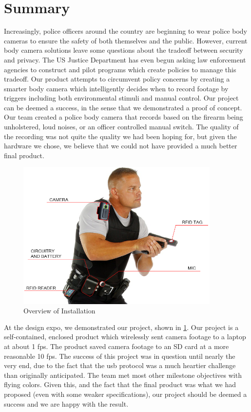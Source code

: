 \documentclass[12pt]{article}
\begin{document}
\section{Summary}
Increasingly, police officers around the country are beginning to wear police
body cameras to ensure the safety of both themselves and the public. However,
current body camera solutions leave some questions about the tradeoff between
security and privacy. The US Justice Department has even begun asking law
enforcement agencies to construct and pilot programs which create policies to
manage this tradeoff\cite{officer_privacy}. Our product attempts to circumvent
policy concerns by creating a smarter body camera which intelligently decides
when to record footage by triggers including both environmental stimuli and
manual control.  Our project can be deemed a success, in the sense that we
demonstrated a proof of concept. Our team created a police body camera that
records based on the firearm being unholstered, loud noises, or an officer
controlled manual switch.  The quality of the recording was not quite the
quality we had been hoping for, but given the hardware we chose, we believe
that we could not have provided a much better final product. 

\begin{figure}[h]
    \centering
    \includegraphics[width=0.9\textwidth]{installation}
    \caption{Overview of Installation}
    \label{fig:installation}
\end{figure}

At the design expo, we demonstrated our project, shown in
\ref{fig:installation}.  Our project is a self-contained, enclosed product
which wirelessly sent camera footage to a laptop at about 1 \gls{fps}. The
product saved camera footage to an SD card at a more reasonable 10 \gls{fps}.
The success of this project was in question until nearly the very end, due to
the fact that the \gls{usb} protocol was a much heartier challenge than
originally anticipated. The team met most other milestone objectives with
flying colors. Given this, and the fact that the final product was what we had
proposed (even with some weaker specifications), our project should be deemed a
success and we are happy with the result.
\end{document}
